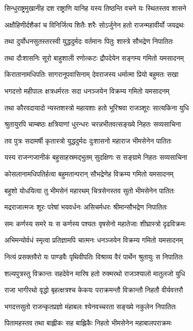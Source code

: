 \twolineshloka
{सिन्धुराष्ट्रमुखानीह दश राष्ट्राणि यानिह}
{यस्य तिष्ठन्ति वचने यः स्थितस्तव शासने}


\twolineshloka
{अक्षौहिणीर्दशैकां च विनिर्जित्य शितैः शरैः}
{सोऽर्जुनेन हतो राजन्महावीर्यो जयद्रथः}


\twolineshloka
{तथा दुर्योधनसुतस्तरस्वी युद्धदुर्मदः}
{वर्तमानः पितुः शास्त्रे सौभद्रेण निपातितः}


\twolineshloka
{तथा दौःशासनिः सूरो बाहुशाली रणोत्कटः}
{द्रौपदेयेन सङ्गम्य गमितो यमसादनम्}


\twolineshloka
{किरातानामधिपतिः सागरानूपवासिनाम्}
{देवराजस्य धर्मात्मा प्रियो बहुमतः सखा}


\twolineshloka
{भगदत्तो महीपालः क्षत्रधर्मरतः सदा}
{धनञ्जयेन विक्रम्य गमितो यमसादनम्}


\twolineshloka
{तथा कौरवदायादो न्यस्तशस्त्रो महायशाः}
{हतो भूरिश्रवा राजञ्शूरः सात्यकिना युधि}


\twolineshloka
{श्रुतायुरपि चाम्बष्ठः क्षत्रियाणां धुरन्धरः}
{चरन्नभीतवत्सङ्ख्ये निहतः सव्यसाचिना}


\twolineshloka
{तव पुत्रः सदामर्षी कृतास्त्रो युद्धदुर्मदः}
{दुःशासनो महाराज भीमसेनेन पातितः}


\twolineshloka
{यस्य राजन्गजानीकं बहुसाहस्रमद्भुतम्}
{सुदक्षिणः स सङ्ग्रामे निहतः सव्यसाचिना}


\twolineshloka
{कोसलानामधिपतिर्हत्वा बहुमतान्परान्}
{सौभद्रेणेह विक्रम्य गमितो यमसादनम्}


\twolineshloka
{बहुशो योधयित्वा तु भीमसेनं महारथम्}
{चित्रसेनस्तव सुतो भीमसेनेन पातितः}


\twolineshloka
{मद्रराजात्मजः शूरः परेषां भयवर्धनः}
{असिचर्मधरः श्रीमान्सौभद्रेण निपातितः}


\twolineshloka
{समः कर्णस्य समरे यः स कर्णस्य पश्यतः}
{वृषसेनो महातेजाः शीघ्रास्त्रो दृढविक्रमः}


\twolineshloka
{अभिमन्योर्वधं स्मृत्वा प्रतिज्ञामपि चात्मनः}
{धनञ्जयेन विक्रम्य गमितो यमसादनम्}


\twolineshloka
{नित्यं प्रसक्तवैरो यः पाण्डवैः पृथिवीपतिः}
{विश्राव्य वैरं पार्थेन श्रुतायुः स निपातितः}


\twolineshloka
{शल्यपुत्रस्तु विक्रान्तः सहदेवेन मारिष}
{हतो रुक्मरथो राजञ्श्यालो मातुलजो युधि}


\twolineshloka
{राजा भागीरथो वृद्धो बृहत्क्षत्रश्च केकयः}
{पराक्रमन्तौ विक्रान्तौ निहतौ वीर्यवत्तरौ}


\twolineshloka
{भगदत्तसुतो राजन्कृतप्रज्ञो मंहाबलः}
{श्येनवच्चरता सङ्ख्ये नकुलेन निपातितः}


\twolineshloka
{पितामहस्तव तथा बाह्लीकः सह बाह्लिकैः}
{निहतो भीमसेनेन महाबालपराक्रमः}


